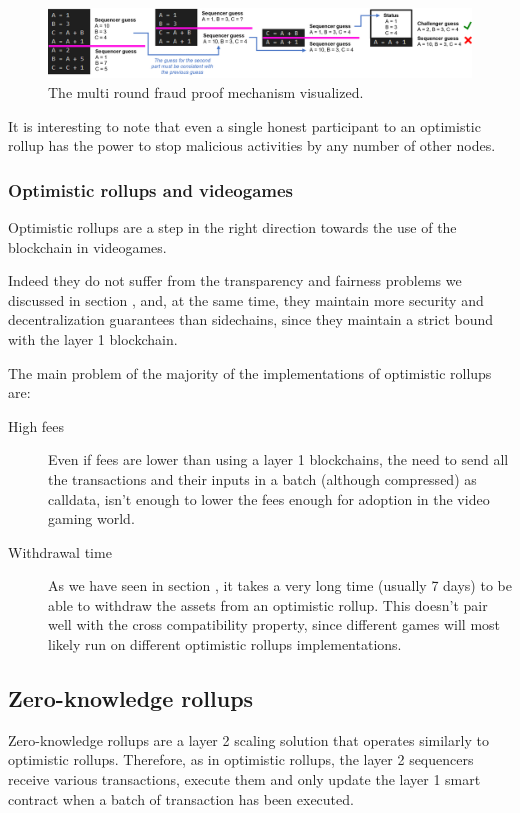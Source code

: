 \documentclass[12pt]{article}
\begin{document}
\begin{figure}[h]
    \centering
    \includegraphics[width=\textwidth]{multi_round_fraud_proof}
    \caption{The multi round fraud proof mechanism visualized.}
    \label{figure:multi_round_fraud_proof}
\end{figure}

It is interesting to note that even a single honest participant to an optimistic rollup has the power to stop malicious activities by any number of other nodes.

\subsubsection{Optimistic rollups and videogames} \label{subsubsection:orav}
Optimistic rollups are a step in the right direction towards the use of the blockchain in videogames.

Indeed they do not suffer from the transparency and fairness problems we discussed in section , and, at the same time, they maintain more security and decentralization guarantees than sidechains, since they maintain a strict bound with the layer 1 blockchain.

The main problem of the majority of the implementations of optimistic rollups are:
\begin{description}
    \item[High fees] Even if fees are lower than using a layer 1 blockchains, the need to send all the transactions and their inputs in a batch (although compressed) as calldata, isn't enough to lower the fees enough for adoption in the video gaming world.
    \item[Withdrawal time] As we have seen in section , it takes a very long time (usually 7 days) to be able to withdraw the assets from an optimistic rollup. This doesn't pair well with the cross compatibility property, since different games will most likely run on different optimistic rollups implementations.
\end{description}

\subsection{Zero-knowledge rollups} \label{subsection:zk_rollups}
Zero-knowledge rollups are a layer 2 scaling solution that operates similarly to optimistic rollups. Therefore, as in optimistic rollups, the layer 2 sequencers receive various transactions, execute them and only update the layer 1 smart contract when a batch of transaction has been executed.
\end{document}
